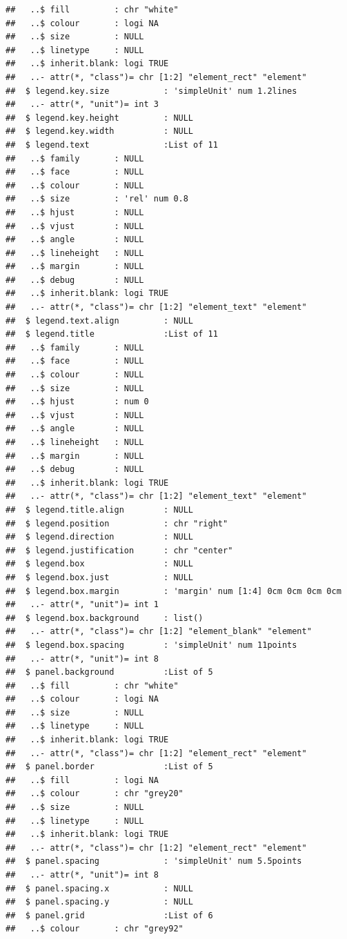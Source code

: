 \documentclass[
]{article}
\begin{document}
\begin{verbatim}
##   ..$ fill         : chr "white"
##   ..$ colour       : logi NA
##   ..$ size         : NULL
##   ..$ linetype     : NULL
##   ..$ inherit.blank: logi TRUE
##   ..- attr(*, "class")= chr [1:2] "element_rect" "element"
##  $ legend.key.size           : 'simpleUnit' num 1.2lines
##   ..- attr(*, "unit")= int 3
##  $ legend.key.height         : NULL
##  $ legend.key.width          : NULL
##  $ legend.text               :List of 11
##   ..$ family       : NULL
##   ..$ face         : NULL
##   ..$ colour       : NULL
##   ..$ size         : 'rel' num 0.8
##   ..$ hjust        : NULL
##   ..$ vjust        : NULL
##   ..$ angle        : NULL
##   ..$ lineheight   : NULL
##   ..$ margin       : NULL
##   ..$ debug        : NULL
##   ..$ inherit.blank: logi TRUE
##   ..- attr(*, "class")= chr [1:2] "element_text" "element"
##  $ legend.text.align         : NULL
##  $ legend.title              :List of 11
##   ..$ family       : NULL
##   ..$ face         : NULL
##   ..$ colour       : NULL
##   ..$ size         : NULL
##   ..$ hjust        : num 0
##   ..$ vjust        : NULL
##   ..$ angle        : NULL
##   ..$ lineheight   : NULL
##   ..$ margin       : NULL
##   ..$ debug        : NULL
##   ..$ inherit.blank: logi TRUE
##   ..- attr(*, "class")= chr [1:2] "element_text" "element"
##  $ legend.title.align        : NULL
##  $ legend.position           : chr "right"
##  $ legend.direction          : NULL
##  $ legend.justification      : chr "center"
##  $ legend.box                : NULL
##  $ legend.box.just           : NULL
##  $ legend.box.margin         : 'margin' num [1:4] 0cm 0cm 0cm 0cm
##   ..- attr(*, "unit")= int 1
##  $ legend.box.background     : list()
##   ..- attr(*, "class")= chr [1:2] "element_blank" "element"
##  $ legend.box.spacing        : 'simpleUnit' num 11points
##   ..- attr(*, "unit")= int 8
##  $ panel.background          :List of 5
##   ..$ fill         : chr "white"
##   ..$ colour       : logi NA
##   ..$ size         : NULL
##   ..$ linetype     : NULL
##   ..$ inherit.blank: logi TRUE
##   ..- attr(*, "class")= chr [1:2] "element_rect" "element"
##  $ panel.border              :List of 5
##   ..$ fill         : logi NA
##   ..$ colour       : chr "grey20"
##   ..$ size         : NULL
##   ..$ linetype     : NULL
##   ..$ inherit.blank: logi TRUE
##   ..- attr(*, "class")= chr [1:2] "element_rect" "element"
##  $ panel.spacing             : 'simpleUnit' num 5.5points
##   ..- attr(*, "unit")= int 8
##  $ panel.spacing.x           : NULL
##  $ panel.spacing.y           : NULL
##  $ panel.grid                :List of 6
##   ..$ colour       : chr "grey92"

\end{verbatim}
\end{document}
